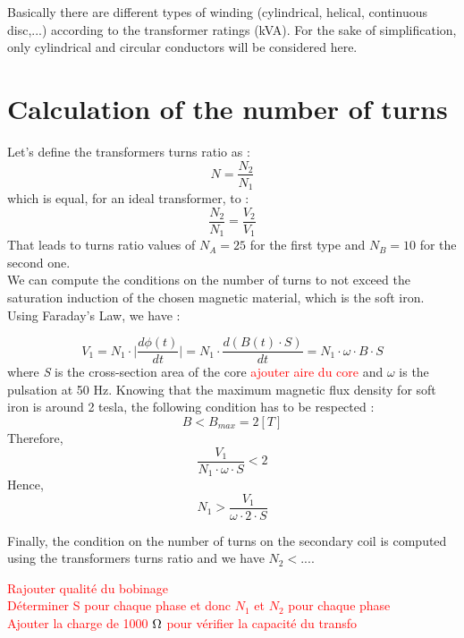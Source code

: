 \documentclass[12pt,a4paper]{report}
\begin{document}
Basically there are different types of winding (cylindrical, helical, continuous disc,...) according to the transformer ratings (kVA). For the sake of simplification, only cylindrical and circular conductors will be considered here.

\section{Calculation of the number of turns}
Let's define the transformers turns ratio as :
\begin{equation}
     N =  \frac{N_2}{N_1}
\end{equation}
which is equal, for an ideal transformer, to :
\begin{equation}
\frac{N_2}{N_1} = \frac{V_2}{V_1}
\end{equation}
That leads to turns ratio values of $N_A = 25$ for the first type and $N_B = 10$ for the second one.\\

We can compute the conditions on the number of turns to not exceed the saturation induction of the chosen magnetic material, which is the soft iron. Using Faraday's Law, we have :

\begin{equation}
    V_1 = N_1 \cdot \mid \frac{d\phi(t)}{dt} \mid = N_1 \cdot \frac{d(B(t)\cdot S)}{dt} = N_1 \cdot \omega \cdot B \cdot S
\end{equation}
where \textit{S} is the cross-section area of the core \textcolor{red}{ajouter aire du core} and $\omega$ is the pulsation at 50 Hz. Knowing that the maximum magnetic flux density for soft iron is around 2 tesla, the following condition has to be respected :
\begin{equation}
    B < B_{max} = 2 [T]
\end{equation}
Therefore, 
\begin{equation}
       \frac{V_1}{N_1 \cdot \omega \cdot S} < 2
\end{equation}
Hence,
\begin{equation}
N_1 > \frac{V_1}{\omega \cdot 2 \cdot S}
\end{equation}

Finally, the condition on the number of turns on the secondary coil is computed using the transformers turns ratio and we have $N_2 < ...$.

 \textcolor{red}{Rajouter qualité du bobinage}\\
 \textcolor{red}{Déterminer S pour chaque phase et donc $N_1$ et $N_2$ pour chaque phase}\\
\textcolor{red}{Ajouter la charge de 1000 $\ohm$ pour vérifier la capacité du transfo}
\end{document}
